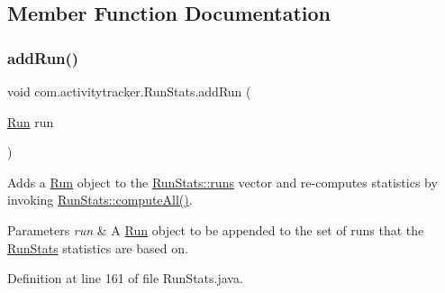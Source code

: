 \subsection{Member Function Documentation}
\mbox{\label{classcom_1_1activitytracker_1_1_run_stats_a1b00f177e7c4abc155bb03c6a8b5d7dd}} 
\subsubsection{\texorpdfstring{addRun()}{addRun()}}
{\footnotesize\ttfamily void com.\+activitytracker.\+Run\+Stats.\+add\+Run (\begin{DoxyParamCaption}\item[{\mbox{\hyperlink{classcom_1_1activitytracker_1_1_run}{Run}}}]{run }\end{DoxyParamCaption})}

Adds a \mbox{\hyperlink{classcom_1_1activitytracker_1_1_run}{Run}} object to the \mbox{\hyperlink{classcom_1_1activitytracker_1_1_run_stats_a0fd429e9f463ddf4897c507c0e3c0a12}{Run\+Stats\+::runs}} vector and re-\/computes statistics by invoking \mbox{\hyperlink{classcom_1_1activitytracker_1_1_run_stats_a85018dbaae7a08213d443a0697e59ee4}{Run\+Stats\+::compute\+All()}}.


\begin{DoxyParams}{Parameters}
{\em run} & A \mbox{\hyperlink{classcom_1_1activitytracker_1_1_run}{Run}} object to be appended to the set of runs that the \mbox{\hyperlink{classcom_1_1activitytracker_1_1_run_stats}{Run\+Stats}} statistics are based on. \\
\hline
\end{DoxyParams}


Definition at line 161 of file Run\+Stats.\+java.


\begin{DoxyCode}{0}

\end{DoxyCode}
\mbox{\label{classcom_1_1activitytracker_1_1_run_stats_ac73cb94cc8ff604fe446d9a327e420cc}} 
